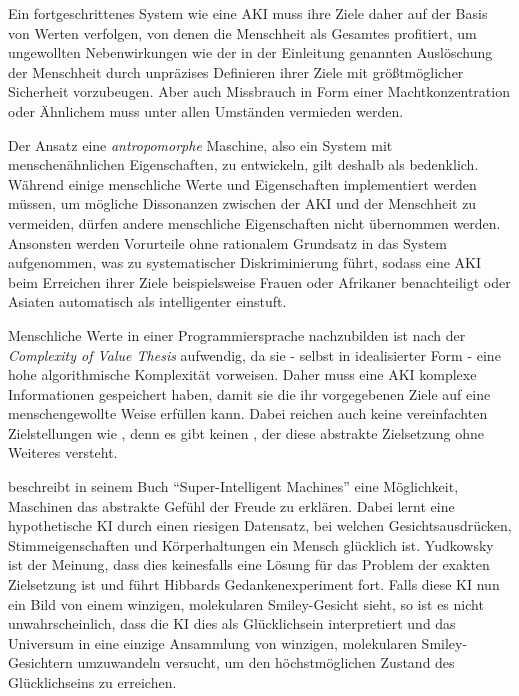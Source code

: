 Ein fortgeschrittenes System wie eine AKI muss ihre Ziele daher auf der Basis von Werten verfolgen, von denen die Menschheit als Gesamtes profitiert, um ungewollten Nebenwirkungen wie der in der Einleitung genannten Auslöschung der Menschheit durch unpräzises Definieren ihrer Ziele mit größtmöglicher Sicherheit vorzubeugen. Aber auch Missbrauch in Form einer Machtkonzentration oder Ähnlichem muss unter allen Umständen vermieden werden.

Der Ansatz eine \emph{antropomorphe} Maschine, also ein System mit menschenähnlichen Eigenschaften, zu entwickeln, gilt deshalb als bedenklich. Während einige menschliche Werte und Eigenschaften implementiert werden müssen, um mögliche Dissonanzen zwischen der AKI und der Menschheit zu vermeiden, dürfen andere menschliche Eigenschaften nicht übernommen werden. Ansonsten werden Vorurteile ohne rationalem Grundsatz in das System aufgenommen, was zu systematischer Diskriminierung führt, sodass eine AKI beim Erreichen ihrer Ziele beispielsweise Frauen oder Afrikaner benachteiligt oder Asiaten automatisch als intelligenter einstuft.

Menschliche Werte in einer Programmiersprache nachzubilden ist nach der \emph{Complexity of Value Thesis} aufwendig, da sie - selbst in idealisierter Form - eine hohe algorithmische Komplexität vorweisen. Daher muss eine AKI komplexe Informationen gespeichert haben, damit sie die ihr vorgegebenen Ziele auf eine menschengewollte Weise erfüllen kann. Dabei reichen auch keine vereinfachten Zielstellungen wie  , denn es gibt keinen , der diese abstrakte Zielsetzung ohne Weiteres versteht.

\citeauthor{hibbard_super-intelligent_2002} beschreibt in seinem Buch \enquote{Super-Intelligent Machines} eine Möglichkeit, Maschinen das abstrakte Gefühl der Freude zu erklären. Dabei lernt eine hypothetische KI durch einen riesigen Datensatz, bei welchen Gesichtsausdrücken, Stimmeigenschaften und Körperhaltungen ein Mensch glücklich ist. Yudkowsky ist der Meinung, dass dies keinesfalls eine Lösung für das Problem der exakten Zielsetzung ist und führt Hibbards Gedankenexperiment fort. Falls diese KI nun ein Bild von einem winzigen, molekularen Smiley-Gesicht sieht, so ist es nicht unwahrscheinlich, dass die KI dies als Glücklichsein interpretiert und das Universum in eine einzige Ansammlung von winzigen, molekularen Smiley-Gesichtern umzuwandeln versucht, um den höchstmöglichen Zustand des Glücklichseins zu erreichen. 


